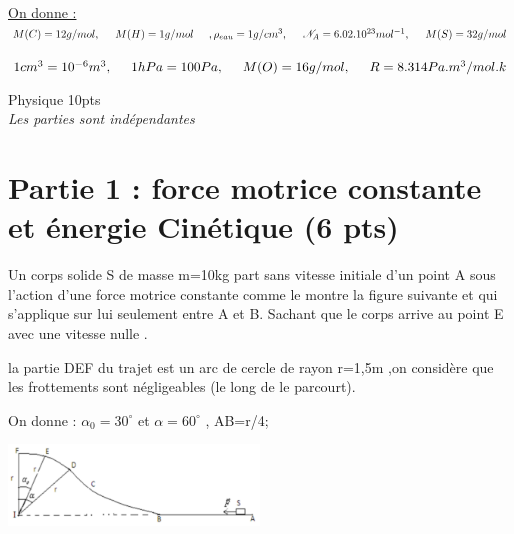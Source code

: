 \documentclass[12pt]{article}
\begin{document}
\begin{enumerate}
        \underline{On donne :}\\ $M(C) = 12g/mol ,\hspace{5mm} M(H) = 1g/mol \hspace{5mm} , \rho_{eau} = 1g/cm^3 , \hspace{5mm}\mathscr{N}_A = 6.02.10^{23}mol^{-1}\\, \hspace{5mm}M(S) =32g/mol $

        $1cm^{3}=10^{-6}m^3 , \hspace{5mm}1hPa = 100Pa ,\hspace{5mm}M(O)=16g/mol,\hspace{5mm} R = 8.314Pa.m^3/mol.k$
\end{enumerate}


\begin{center}
    \vspace{3cm}
\hrulefill
\Large{Physique 10pts}
\hrulefill\\
    \emph{Les parties sont indépendantes}
\end{center}

 \section*{Partie 1 : force motrice constante et énergie Cinétique \dotfill(6 pts)}
Un corps solide S de masse m=10kg part sans vitesse initiale d’un point A sous l’action d’une force motrice constante
comme le montre la figure suivante et qui s’applique sur lui seulement entre A et B.
Sachant que le corps arrive au point E avec une vitesse nulle .

 la partie DEF du trajet est un arc de cercle de rayon r=1,5m ,on considère que les frottements sont négligeables (le long de le parcourt).

 On donne : $\alpha_0 = 30^\circ$ et $\alpha = 60^{\circ}$ , AB=r/4;
\begin{center}
    \includegraphics[width=0.5\textwidth]{./img/img00.jpg}
\end{center}
\end{document}
